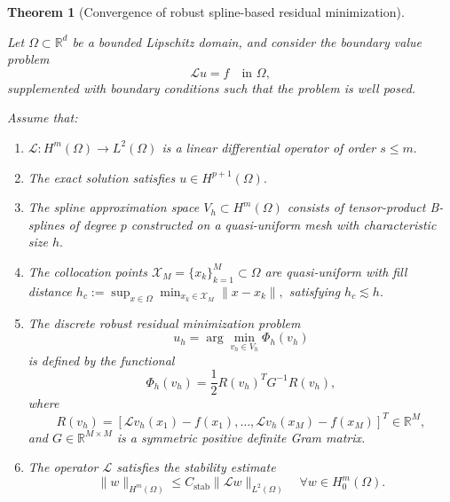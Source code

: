 \documentclass[10pt,a4paper]{amsart}
\newtheorem{theorem}{Theorem}
\begin{document}
\begin{theorem}[Convergence of robust spline-based residual minimization]
\label{thm:robust_iga_odil}

Let $\Omega \subset \mathbb{R}^d$ be a bounded Lipschitz domain, and consider the boundary value problem
\begin{equation}
\mathcal{L}u = f
\quad \text{in } \Omega,
\label{eq:general_pde}
\end{equation}
supplemented with boundary conditions such that the problem is well posed.

Assume that:

\begin{enumerate}

\item
$\mathcal{L}:H^m(\Omega)\to L^2(\Omega)$
is a linear differential operator of order
$
s\le m.
$

\item
The exact solution satisfies
$
u\in H^{p+1}(\Omega).
$

\item
The spline approximation space
$
V_h\subset H^m(\Omega)
$
consists of tensor-product B-splines of degree
$
p
$
constructed on a quasi-uniform mesh with characteristic size
$
h.
$

\item
The collocation points
$
\mathcal{X}_M=\{x_k\}_{k=1}^M\subset\Omega
$
are quasi-uniform with fill distance
$
h_c
:=
\sup_{x\in\Omega}
\min_{x_k\in\mathcal{X}_M}
\|x-x_k\|,
$
satisfying
$
h_c\lesssim h.
$

\item
The discrete robust residual minimization problem
\begin{equation}
u_h
=
\arg\min_{v_h\in V_h}
\Phi_h(v_h)
\label{eq:robust_discrete_problem}
\end{equation}
is defined by the functional
\begin{equation}
\Phi_h(v_h)
=
\frac12
R(v_h)^T
G^{-1}
R(v_h),
\label{eq:robust_functional}
\end{equation}
where
\begin{equation}
R(v_h)
=
\left[
\mathcal{L}v_h(x_1)-f(x_1),
\dots,
\mathcal{L}v_h(x_M)-f(x_M)
\right]^T
\in\mathbb{R}^M,
\end{equation}
and
$
G\in\mathbb{R}^{M\times M}
$
is a symmetric positive definite Gram matrix.

\item
The operator $\mathcal{L}$ satisfies the stability estimate
\begin{equation}
\|w\|_{H^m(\Omega)}
\le
C_{\mathrm{stab}}
\|\mathcal{L}w\|_{L^2(\Omega)}
\quad
\forall w\in H_0^m(\Omega).
\label{eq:stability_assumption_theorem}
\end{equation}


\end{enumerate}
\end{theorem}
\end{document}
